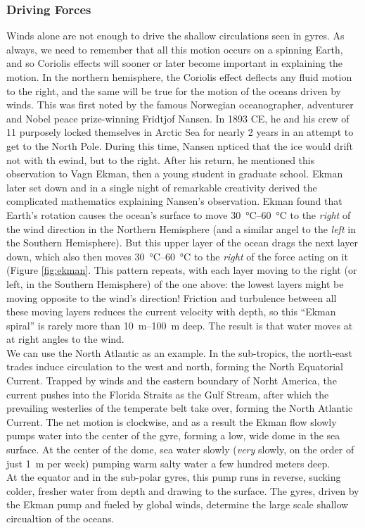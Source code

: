 {\subsubsection{Driving Forces}
Winds alone are not enough to drive the shallow circulations seen in gyres. As always, we need to remember that all this motion occurs on a spinning Earth, and so Coriolis effects will sooner or later become important in explaining the motion. In the northern hemisphere, the Coriolis effect deflects any fluid motion to the right, and the same will be true for the motion of the oceans driven by winds. This was first noted by the famous Norwegian oceanographer, adventurer and Nobel peace prize-winning Fridtjof Nansen. In 1893 CE, he and his crew of 11 purposely locked themselves in Arctic Sea for nearly 2 years in an attempt to get to the North Pole. During this time, Nansen npticed that the ice would drift not with th ewind, but to the right. After his return, he mentioned this observation to Vagn Ekman, then a young student in graduate school. Ekman later set down and in a single night of remarkable creativity derived the complicated mathematics explaining Nansen's observation. Ekman found that Earth's rotation causes the ocean's surface to move \SIrange{30}{60}{\celsius} to the \emph{right} of the wind direction in the Northern Hemisphere (and a similar angel to the \emph{left} in the Southern Hemisphere). But this upper layer of the ocean drags the next layer down, which also then moves \SIrange{30}{60}{\celsius} to the \emph{right} of the force acting on it (Figure \ref{fig:ekman}. This pattern repeats, with each layer moving to the right (or left, in the Southern Hemisphere) of the one above: the lowest layers might be moving opposite to the wind's direction! Friction and turbulence between all these moving layers reduces the current velocity with depth, so this ``Ekman spiral'' is rarely more than \SIrange{10}{100}{\metre} deep. The result is that water moves at at right angles to the wind.\\
We can use the North Atlantic as an example. In the sub-tropics, the north-east trades induce circulation to the west and north, forming the North Equatorial Current. Trapped by winds and the eastern boundary of Norht America, the current pushes into the Florida Straits as the Gulf Stream, after which the prevailing westerlies of the temperate belt take over, forming the North Atlantic Current. The net motion is clockwise, and as a result the Ekman flow slowly pumps water into the center of the gyre, forming a low, wide dome in the sea surface. At the center of the dome, sea water slowly (\emph{very} slowly, on the order of just \SI{1}{\metre} per week) pumping warm salty water a few hundred meters deep.\\ At the equator and in the sub-polar gyres, this pump runs in reverse, sucking colder, fresher water from depth and drawing to the surface. The gyres, driven by the Ekman pump and fueled by global winds, determine the large scale shallow circualtion of the oceans.
}
